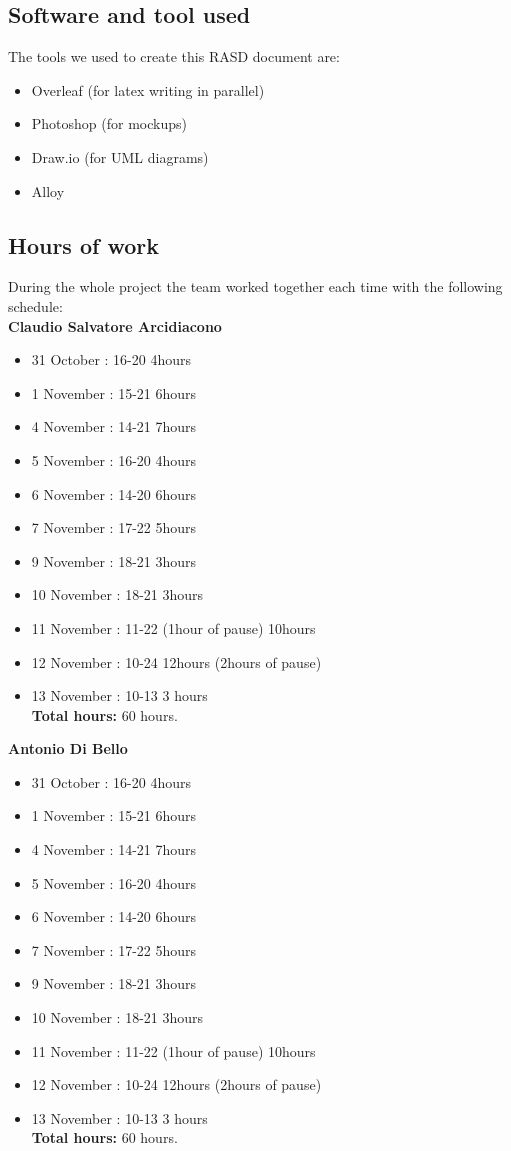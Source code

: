 \subsection{Software and tool used}
The tools we used to create this RASD document are:
\begin{itemize}
\item Overleaf (for latex writing in parallel)
\item Photoshop (for mockups)
\item Draw.io (for UML diagrams)
\item Alloy
\end{itemize}

\subsection{Hours of work}
During the whole  project the team worked together each time with the following schedule:\\
\textbf{Claudio Salvatore Arcidiacono}
\begin{itemize}
\item 31 October : 16-20  4hours
\item 1 November : 15-21  6hours
\item 4 November : 14-21  7hours
\item 5 November : 16-20  4hours
\item 6 November : 14-20  6hours
\item 7 November : 17-22  5hours
\item 9 November : 18-21  3hours
\item 10 November : 18-21  3hours
\item 11 November : 11-22 (1hour of pause) 10hours
\item 12 November : 10-24  12hours (2hours of pause)
\item 13 November : 10-13 3 hours \\

\textbf{Total hours:} 60 hours.
\end{itemize}


\textbf{Antonio Di Bello}
\begin{itemize}
\item 31 October : 16-20  4hours
\item 1 November : 15-21  6hours
\item 4 November : 14-21  7hours
\item 5 November : 16-20  4hours
\item 6 November : 14-20  6hours
\item 7 November : 17-22  5hours
\item 9 November : 18-21  3hours
\item 10 November : 18-21  3hours
\item 11 November : 11-22 (1hour of pause) 10hours
\item 12 November : 10-24  12hours (2hours of pause)
\item 13 November : 10-13 3 hours \\

\textbf{Total hours:} 60 hours.
\end{itemize}



